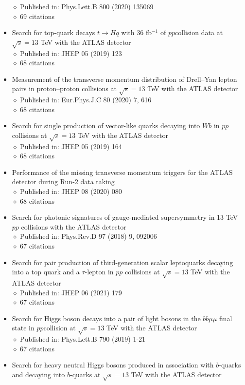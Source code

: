 \documentclass[margin, 10pt]{res} %
\begin{document}
\begin{resume}
\begin{itemize}
$\diamond$ Published in: Phys.Lett.B 800 (2020) 135069\\
$\diamond$ 69 citations
\item Search for top-quark decays $t \rightarrow Hq$ with 36 fb$^{-1}$ of $pp$collision data at $\sqrt{s} = 13$ TeV with the ATLAS detector\\
$\diamond$ Published in: JHEP 05 (2019) 123\\
$\diamond$ 68 citations
\item Measurement of the transverse momentum distribution of Drell–Yan lepton pairs in proton–proton collisions at $\sqrt{s} = 13$ TeV with the ATLAS detector\\
$\diamond$ Published in: Eur.Phys.J.C 80 (2020) 7, 616\\
$\diamond$ 68 citations
\item Search for single production of vector-like quarks decaying into $Wb$ in $pp$ collisions at $\sqrt{s} = 13$ TeV with the ATLAS detector\\
$\diamond$ Published in: JHEP 05 (2019) 164\\
$\diamond$ 68 citations
\item Performance of the missing transverse momentum triggers for the ATLAS detector during Run-2 data taking\\
$\diamond$ Published in: JHEP 08 (2020) 080\\
$\diamond$ 68 citations
\item Search for photonic signatures of gauge-mediated supersymmetry in 13 TeV $pp$ collisions with the ATLAS detector\\
$\diamond$ Published in: Phys.Rev.D 97 (2018) 9, 092006\\
$\diamond$ 67 citations
\item Search for pair production of third-generation scalar leptoquarks decaying into a top quark and a $\tau$-lepton in $pp$ collisions at $\sqrt{s} = 13$ TeV with the ATLAS detector\\
$\diamond$ Published in: JHEP 06 (2021) 179\\
$\diamond$ 67 citations
\item Search for Higgs boson decays into a pair of light bosons in the $bb\mu\mu$ final state in $pp$collision at $\sqrt{s} = 13$ TeV with the ATLAS detector\\
$\diamond$ Published in: Phys.Lett.B 790 (2019) 1-21\\
$\diamond$ 67 citations
\item Search for heavy neutral Higgs bosons produced in association with $b$-quarks and decaying into $b$-quarks at $\sqrt{s} = 13$ TeV with the ATLAS detector\\

\end{itemize}
\end{resume}
\end{document}
